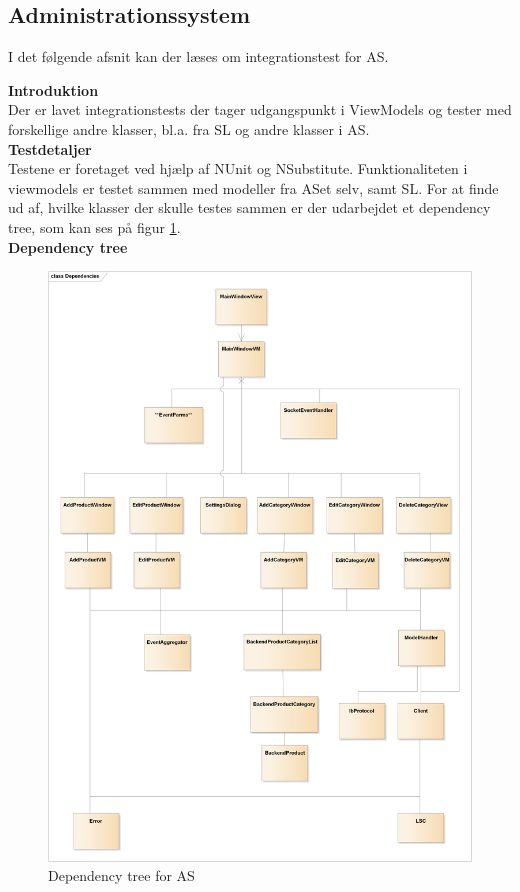 \subsection{Administrationssystem}
I det følgende afsnit kan der læses om integrationstest for \gls{AS}.

\textbf{Introduktion}\\
Der er lavet integrationstests der tager udgangspunkt i ViewModels og tester med forskellige andre klasser, bl.a. fra \gls{SL} og andre klasser i \gls{AS}.\\

\textbf{Testdetaljer}\\
Testene er foretaget ved hjælp af NUnit og NSubstitute. Funktionaliteten i viewmodels er testet sammen med modeller fra \gls{AS}et selv, samt \gls{SL}. For at finde ud af, hvilke klasser der skulle testes sammen er der udarbejdet et dependency tree, som kan ses på figur \ref{fig:AS-dependencies}.\\

\newpage
\textbf{Dependency tree}
\begin{figure}[H]
	\centering
	\includegraphics[width=1\textwidth]{Test/Integrationstest/Images/AS-Dependencies}
	\caption{Dependency tree for \gls{AS}}
	\label{fig:AS-dependencies}
\end{figure}

